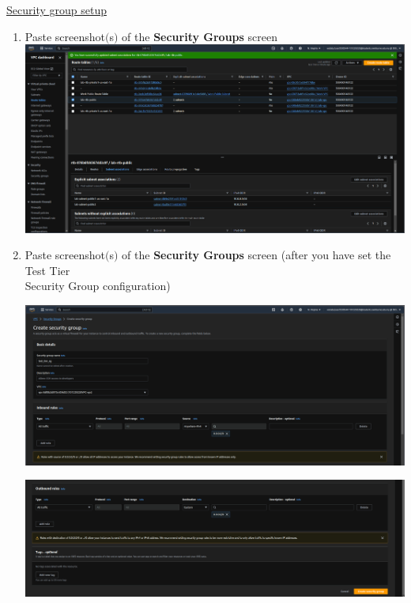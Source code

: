 \documentclass[11pt]{article}
\begin{document}
\vspace{1cm}

\newpage

\noindent\underline{Security group setup}
\begin{enumerate}[resume]
    \item Paste screenshot$($s$)$ of the \textbf{Security Groups} screen \\

    {\centering
    \includegraphics[width=5.8in]{pics/10.png}
    }


    \item Paste screenshot$($s$)$ of the \textbf{Security Groups} screen (after you have set the Test Tier\\ Security Group configuration)\\
    \vspace{5mm}

    {\centering
    \includegraphics[width=5.8in]{pics/11a.png}
    }


    {\centering
    \includegraphics[width=5.8in]{pics/11b.png}
    }



\end{enumerate}
\end{document}
